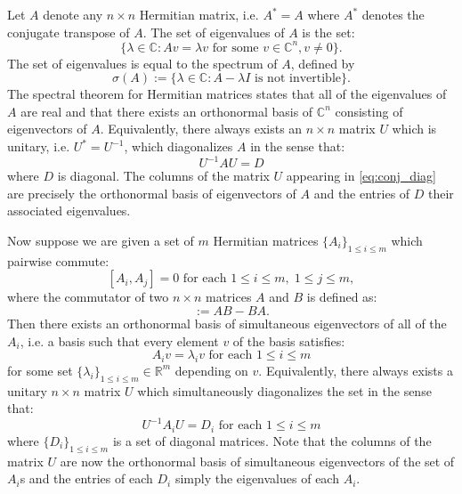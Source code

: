 \documentclass[a4paper]{article}
\begin{document}
Let $A$ denote any $n \times n$ {Hermitian} matrix, i.e. $A^* = A$ where $A^*$ denotes the conjugate transpose of $A$. The set of {eigenvalues} of $A$ is the set:
\begin{equation}
	\{ \lambda \in \mathbb{C} : A v = \lambda v \text{ for some $v \in \mathbb{C}^n, v \neq 0$}\}.
\end{equation}
The set of eigenvalues is equal to the spectrum of $A$, defined by
\begin{equation}
	\sigma(A) := \{\lambda \in \mathbb{C} : A - \lambda I \text{ is not invertible}\}.
\end{equation}
The spectral theorem for Hermitian matrices \cite{HoffmanKunze} states that all of the eigenvalues of $A$ are real and that there exists an orthonormal basis of $\mathbb{C}^n$ consisting of eigenvectors of $A$. Equivalently, there always exists an $n \times n$ matrix $U$ which is unitary, i.e. $U^* = U^{-1}$, which diagonalizes $A$ in the sense that:
\begin{equation} \label{eq:conj_diag}
	U^{-1} A U = D
\end{equation}
where $D$ is diagonal. The columns of the matrix $U$ appearing in \eqref{eq:conj_diag} are precisely the orthonormal basis of eigenvectors of $A$ and the entries of $D$ their associated eigenvalues.

Now suppose we are given a set of $m$ Hermitian matrices $\{ A_i \}_{1 \leq i \leq m}$ which pairwise commute:
\begin{equation} \label{eq:pw_comm}
	[A_i,A_j] = 0 \text{ for each } 1 \leq i \leq m, \; 1 \leq j \leq m,
\end{equation}
where the commutator of two $n \times n$ matrices $A$ and $B$ is defined as:
\begin{equation}
	[ A, B ] := A B - B A.
\end{equation}
Then there exists \cite{HoffmanKunze} an orthonormal basis of {simultaneous eigenvectors} of all of the $A_i$, i.e. a basis such that every element $v$ of the basis satisfies:
\begin{equation}
	A_i v = \lambda_i v \text{ for each } 1 \leq i \leq m
\end{equation}
for some set $\{\lambda_i\}_{1 \leq i \leq m} \in \mathbb{R}^m$ depending on $v$. Equivalently, there always exists a unitary $n \times n$ matrix $U$ which {simultaneously diagonalizes} the set in the sense that:
\begin{equation}
	U^{-1} A_i U = D_i \text{ for each } 1 \leq i \leq m
\end{equation}
where $\{ D_i \}_{1 \leq i \leq m}$ is a set of diagonal matrices. Note that the columns of the matrix $U$ are now the orthonormal basis of simultaneous eigenvectors of the set of $A_i$s and the entries of each $D_i$ simply the eigenvalues of each $A_i$. 
\end{document}
